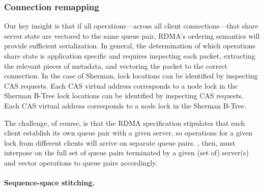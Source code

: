 



\subsubsection{Connection remapping}

Our key insight is that if all operations---across all client connections---that
share server state are vectored to the same queue pair, RDMA's ordering
semantics will provide sufficient serialization.  In general, the determination
of which operations share state is application specific and requires inspecting
each packet, extracting the relevant pieces of metadata, and vectoring the
packet to the correct connection.  In the case of Sherman,
lock locations can be identified by inspecting CAS requests. Each CAS virtual
address corresponds to a node lock in the Sherman B-Tree lock locations can be
identified by inspecting CAS requests. Each CAS virtual address corresponds to a
node lock in the Sherman B-Tree.



The challenge, of course, is that the RDMA specification stipulates
that each client establish its own queue pair with a given server, so
operations for a given lock from different clients will arrive on
separate queue pairs.  \sword, then, must interpose on the
full set of queue pairs terminated by a given (set of) server(s) and
vector operations to queue pairs accordingly.

\paragraph{Sequence-space stitching.}

